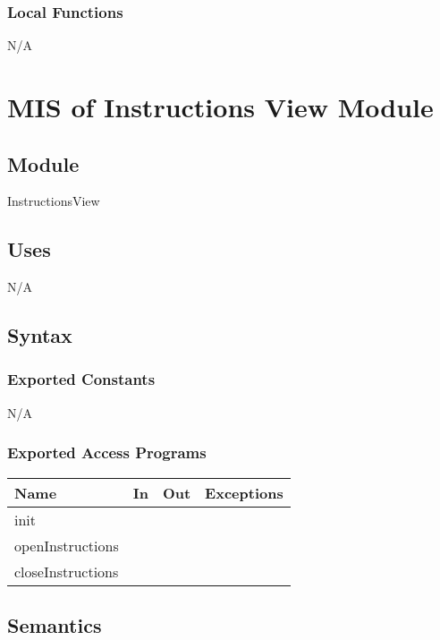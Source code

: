 \documentclass[12pt, titlepage]{article}
\begin{document}
	\subsubsection{Local Functions}
	
	N/A
	
	\newpage
	
	\section{MIS of Instructions View Module} \label{Module}
	
	\subsection{Module}
	
	InstructionsView
	
	\subsection{Uses}
	
	N/A
	
	\subsection{Syntax}
	
	\subsubsection{Exported Constants}
	
	N/A
	
	\subsubsection{Exported Access Programs}
	
	\begin{center}
		\begin{tabular}{l l l l}
			\hline
			\textbf{Name} & \textbf{In} & \textbf{Out} & \textbf{Exceptions} \\
			\hline
			init & & & \\
			openInstructions & &  &  \\
			closeInstructions &  &  &  \\
			\hline
		\end{tabular}
	\end{center}
	
	\subsection{Semantics}
	
\end{document}
